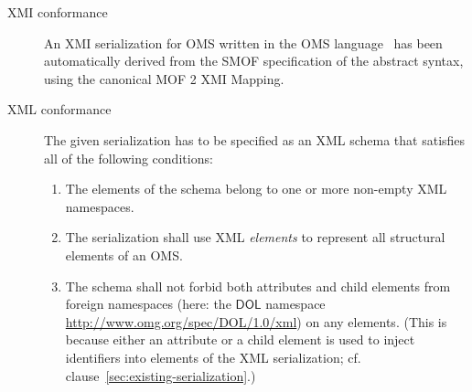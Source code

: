 \documentclass[10pt,fleqn,final]{scrreprt}
\makeatletter
\newcommand*{\eg}{e.g.\@\xspace}
\newcommand*\CommentAuthor{}
\renewcommand*\CommentAuthor{#1}}
\newcommand*\CommentDate{}
\renewcommand*\CommentDate{#1}}
\newcommand*\CommentId{}
\renewcommand*\CommentId{#1}}
\newcommand*\CommentType{}
\renewcommand*\CommentType{#1}}
\newcommand*{\SetCommentColorByType}[1]{%
\edef\localType{{#1}}%
\expandafter\ifstrequal\localType{q-aut}{\colorlet{CommentColor}{red}}{%
\expandafter\ifstrequal\localType{q-all}{\colorlet{CommentColor}{orange}}{%
\expandafter\ifstrequal\localType{todo}{\colorlet{CommentColor}{orange}}{%
\expandafter\ifstrequal\localType{fyi}{\colorlet{CommentColor}{lightgray}}{%
\colorlet{CommentColor}{yellow}}}}}}
\newcommand*{\SetCommentPrefixByType}[1]{%
\edef\localType{{#1}}%
\expandafter\@ifmtarg\localType{%
\edef\CommentPrefix{}%
}{%
\caseupper[q]{#1}%
\edef\CommentPrefix{\thestring: }%
}}
\newcommand*{\initComment}[1]{%
\setkeys{Comment}{#1}%
\SetCommentColorByType{\CommentType}%
\relax%
\SetCommentPrefixByType{\CommentType}%
\relax%
}
\newcommand*{\todonote}[2][]{%
\initComment{#1}%
\pdfcomment[author=\CommentAuthor,color=CommentColor,date=\CommentDate,id=\CommentId]{%
\CommentPrefix
#2}}
\renewcommand*{\todonote}[2][]{%
\initComment{#1}%
\ednote{\CommentPrefix #2}}
\newcommand*{\DOL}{\ensuremath{\mathsf{DOL}}\xspace}
\makeatother
\begin{document}
\begin{description}
\item[XMI conformance]
An XMI serialization  for OMS written in the OMS language \ has been automatically derived from the SMOF specification
of the abstract syntax, using the canonical MOF 2 XMI Mapping.
\item[XML conformance]
The given serialization has to be specified as an XML schema that satisfies
 all of the following conditions:
\begin{enumerate}
\item The elements of the schema belong to one or more non-empty XML
namespaces.%
\item The serialization shall use XML \emph{elements} to represent all structural elements of an OMS.
\item\label{it:foreign-xml-namespaces} The schema shall not forbid both attributes and child elements from foreign namespaces (here: the
 \DOL namespace \url{http://www.omg.org/spec/DOL/1.0/xml}) on any elements. (This  is because either an attribute or a child element is used to inject identifiers into elements of the XML serialization; cf. clause~\ref{sec:existing-serialization}.)
\end{enumerate}


\end{description}
\end{document}

